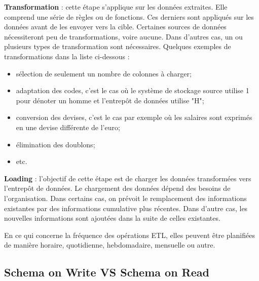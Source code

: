		\textbf{Transformation} : cette étape  s'applique  sur les données extraites. Elle comprend  une série de règles ou de fonctions. Ces derniers sont appliqués sur les données avant de les envoyer vers la cible. Certaines sources de données nécessiteront  peu de transformations, voire aucune. Dans d'autres cas, un ou plusieurs  types de transformation sont  nécessaires. Quelques exemples de transformations dans la liste ci-dessous :
		\begin{itemize}
			\item sélection de  seulement un nombre de colonnes à charger;
			\item adaptation des codes, c'est le cas où le système de stockage source utilise 1 pour dénoter un homme et l'entrepôt de données utilise "H"; 
			\item conversion des devises, c'est le cas par exemple où les salaires sont exprimés en une devise différente de l'euro;
			\item élimination des doublons;
			\item etc.
		\end{itemize}
		
		\textbf{Loading} : l'objectif de cette étape est de charger les données transformées vers l'entrepôt de données. Le chargement des données dépend des besoins de l'organisation. Dans certains cas, on prévoit le remplacement des informations existantes par des informations cumulative plus récentes. Dans d'autre cas, les nouvelles informations sont ajoutées dans la suite de celles existantes. 
		
		En ce qui concerne la fréquence  des opérations ETL, elles peuvent être planifiées de manière horaire, quotidienne, hebdomadaire, mensuelle ou autre.
		
		 
		
		
		
		\subsection{Schema on Write VS Schema on Read} \label{sec:schema-read-write}
		
